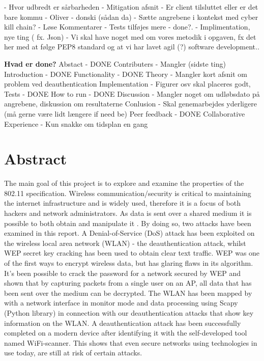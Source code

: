 
- Hvor udbredt er sårbarheden
- Mitigation afsnit
- Er client tilsluttet eller er det bare kommu - Oliver - donski (sådan da)
- Sætte angrebene i kontekst med cyber kill chain?
- Løse Kommentarer
- Tests tilføjes mere - done?.
- Implimentation, nye ting ( fx. Json)
- Vi skal have noget med om vores metodik i opgaven, fx det her med at følge PEP8 standard og at vi har lavet agil (?) software development..


\textbf{Hvad er done?
}Abstact - DONE
Contributers - Mangler (sidste ting)
Introduction - DONE
Functionality - DONE
Theory - Mangler kort afsnit om problem ved deauthentication 
Implementation - Figurer osv skal placeres godt, 
Tests - DONE
How to run - DONE
Discussion - Mangler noget om udløbsdato på angrebene, diskussion om resultaterne
Conlusion - Skal genemarbejdes yderligere (må gerne være lidt længere if need be)
Peer feedback - DONE
Collaborative Experience - Kun snakke om tidsplan en gang


\section*{Abstract}
The main goal of this project is to explore and examine the properties of the 802.11 specification. Wireless communication/security is critical to maintaining the internet infrastructure and is widely used, therefore it is a focus of both hackers and network administrators. As data is sent over a shared medium it is possible to both obtain and manipulate it . By doing so, two attacks have been examined in this report. A Denial-of-Service (DoS) attack has been exploited on the wireless local area network (WLAN) - the deauthentication attack, whilst WEP secret key cracking has been used to obtain clear text traffic. WEP was one of the first ways to encrypt wireless data, but has glaring flaws in its algorithm. It's been possible to crack the password for a network secured by WEP and shown that by capturing packets from a single user on an AP, all data that has been sent over the medium can be decrypted. The WLAN has been mapped by with a network interface in monitor mode and data processing using Scapy (Python library) in connection with our deauthentication attacks that show key information on the WLAN. A deauthentication attack has been successfully completed on a modern device after identifying it with the self-developed tool named WiFi-scanner. This shows that even secure networks using technologies in use today, are still at risk of certain attacks.

\newpage
\tableofcontents
\newpage

